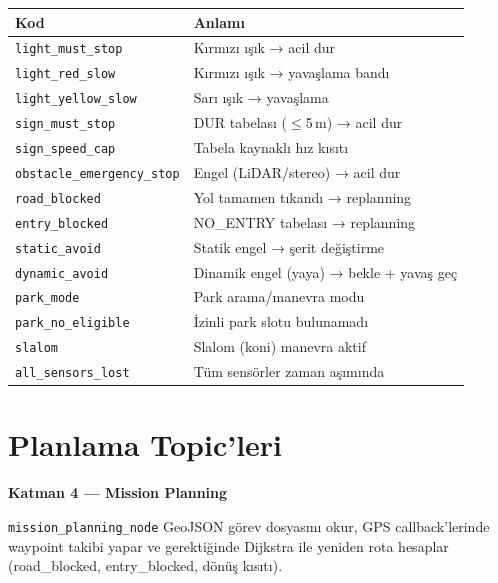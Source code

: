 \documentclass[11pt,a4paper]{article}
\newcommand{\sectionhead}[2]{%
  \noindent
  \colorbox{#1!18}{\parbox{\dimexpr\linewidth-2\fboxsep\relax}{%
    \vspace{3pt}%
    \textbf{\color{#1}\large #2}%
    \vspace{3pt}%
  }}%
  \par\vspace{4pt}%
}
\begin{document}
\begin{center}
\begin{tabular}{@{}p{5.5cm}p{8.5cm}@{}}
\toprule
\textbf{Kod} & \textbf{Anlamı} \\
\midrule
\texttt{light\_must\_stop}         & Kırmızı ışık → acil dur \\
\texttt{light\_red\_slow}          & Kırmızı ışık → yavaşlama bandı \\
\texttt{light\_yellow\_slow}       & Sarı ışık → yavaşlama \\
\texttt{sign\_must\_stop}          & DUR tabelası ($\leq$5\,m) → acil dur \\
\texttt{sign\_speed\_cap}          & Tabela kaynaklı hız kısıtı \\
\texttt{obstacle\_emergency\_stop} & Engel (LiDAR/stereo) → acil dur \\
\texttt{road\_blocked}             & Yol tamamen tıkandı → replanning \\
\texttt{entry\_blocked}            & NO\_ENTRY tabelası → replanning \\
\texttt{static\_avoid}             & Statik engel → şerit değiştirme \\
\texttt{dynamic\_avoid}            & Dinamik engel (yaya) → bekle + yavaş geç \\
\texttt{park\_mode}                & Park arama/manevra modu \\
\texttt{park\_no\_eligible}        & İzinli park slotu bulunamadı \\
\texttt{slalom}                    & Slalom (koni) manevra aktif \\
\texttt{all\_sensors\_lost}        & Tüm sensörler zaman aşımında \\
\bottomrule
\end{tabular}
\end{center}

\newpage

\section{Planlama Topic'leri}
\label{sec:planning}

\sectionhead{clrPlanning}{Katman 4 — Mission Planning}

\texttt{mission\_planning\_node} GeoJSON görev dosyasını okur, GPS
callback'lerinde waypoint takibi yapar ve gerektiğinde Dijkstra ile
yeniden rota hesaplar (road\_blocked, entry\_blocked, dönüş kısıtı).
\end{document}
